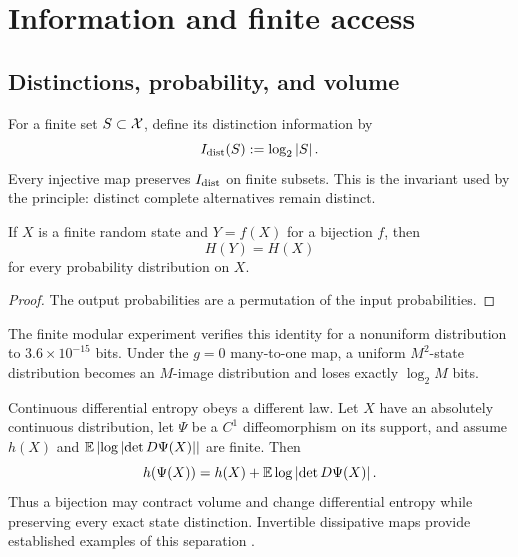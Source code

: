\section{Information and finite access}
\label{sec:information}

\subsection{Distinctions, probability, and volume}

For a finite set \(S\subset\mathcal X\), define its distinction information by
\[
I_{\rm dist}(S):=\log_2\left\lvert S\right\rvert.
\]
Every injective map preserves \(I_{\rm dist}\) on finite subsets. This is the invariant used by the principle: distinct complete alternatives remain distinct.

\begin{theorem}
\label{thm:shannon}
If \(X\) is a finite random state and \(Y=f(X)\) for a bijection \(f\), then
\[
H(Y)=H(X)
\]
for every probability distribution on \(X\).
\end{theorem}

\begin{proof}
The output probabilities are a permutation of the input probabilities.
\end{proof}

The finite modular experiment verifies this identity for a nonuniform distribution to \(3.6\times10^{-15}\) bits. Under the \(g=0\) many-to-one map, a uniform \(M^2\)-state distribution becomes an \(M\)-image distribution and loses exactly \(\log_2M\) bits.

Continuous differential entropy obeys a different law. Let \(X\) have an absolutely continuous distribution, let \(\Psi\) be a \(C^1\) diffeomorphism on its support, and assume \(h(X)\) and \(\mathbb E\left\lvert \log\left\lvert \det D\Psi(X)\right\rvert\right\rvert\) are finite. Then
\begin{equation}
h(\Psi(X))
=
h(X)
+\mathbb E\log\left\lvert \det D\Psi(X)\right\rvert.
\label{eq:differential-entropy}
\end{equation}
Thus a bijection may contract volume and change differential entropy while preserving every exact state distinction. Invertible dissipative maps provide established examples of this separation \citep{henon1976,hoover1996,gilbert1999,ruelle1999}.


